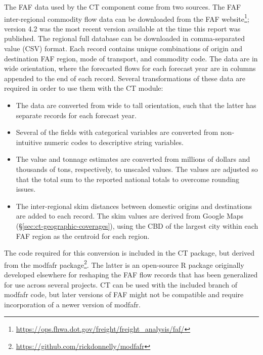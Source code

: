 

The FAF data used by the CT component come from two sources. The FAF inter-regional commodity flow data can be downloaded from the FAF website\footnote{\url{https://ops.fhwa.dot.gov/freight/freight_analysis/faf/}}; version 4.2 was the most recent version available at the time this report was published. The regional full database can be downloaded in comma-separated value (CSV) format. Each record contains unique combinations of origin and destination FAF region, mode of transport, and commodity code. The data are in wide orientation, where the forecasted flows for each forecast year are in columns appended to the end of each record. Several transformations of these data are required in order to use them with the CT module:
\begin{itemize}
\item The data are converted from wide to tall orientation, such that the latter has separate records for each forecast year.
\item Several of the fields with categorical variables are converted from non-intuitive numeric codes to descriptive string variables.
\item The value and tonnage estimates are converted from millions of dollars and thousands of tons, respectively, to unscaled values. The values are adjusted so that the total sum to the reported national totals to overcome rounding issues.
\item The inter-regional skim distances between domestic origins and destinations are added to each record. The skim values are derived from Google Maps (\S\ref{sec:ct-geographic-coverages}), using the CBD of the largest city within each FAF region as the centroid for each region. 
\end{itemize}

\noindent The code required for this conversion is included in the CT package, but derived from the modfafr package\footnote{\url{https://github.com/rickdonnelly/modfafr}}. The latter is an open-source R package originally developed elsewhere for reshaping the FAF flow records that has been generalized for use across several projects. CT can be used with the included branch of modfafr code, but later versions of FAF might not be compatible and require incorporation of a newer version of modfafr. 

